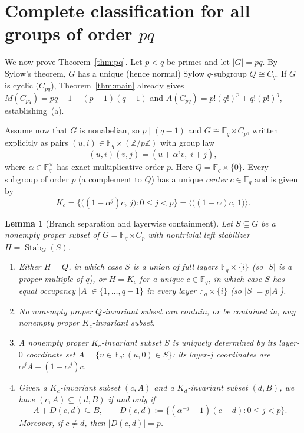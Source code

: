 \documentclass[11pt,reqno]{amsart}
\numberwithin{equation}{section}
\newtheorem{lemma}[theorem]{Lemma}
\theoremstyle{definition}
\theoremstyle{remark}
\newcommand{\Stab}{\operatorname{Stab}}
\newcommand{\F}{\mathbb{F}}
\newcommand{\Z}{\mathbb{Z}}
\begin{document}
\section{Complete classification for all groups of order $pq$}
\label{sec:pq}

We now prove Theorem~\ref{thm:pq}. Let $p<q$ be primes and let $|G|=pq$. By Sylow's theorem, $G$ has a unique (hence normal) Sylow $q$-subgroup $Q\cong C_q$. If $G$ is cyclic ($C_{pq}$), Theorem~\ref{thm:main} already gives $M(C_{pq})=pq-1+(p-1)(q-1)$ and $A(C_{pq})=p!(q!)^p+q!(p!)^q$, establishing~(a).

Assume now that $G$ is nonabelian, so $p\mid (q-1)$ and $G \cong \F_q \rtimes C_p$, written explicitly as pairs $(u,i)\in \F_q\times (\Z/p\Z)$ with group law
\[
(u,i)(v,j) = (u + \alpha^i v,\; i+j),
\]
where $\alpha\in\F_q^\times$ has exact multiplicative order $p$. Here $Q=\F_q\times\{0\}$. Every subgroup of order $p$ (a complement to $Q$) has a unique \emph{center} $c\in\F_q$ and is given by
\[
K_c = \bigl\{\bigl((1-\alpha^j)c,\, j\bigr) : 0\le j<p\bigr\} = \bigl\langle\bigl((1-\alpha)c,\, 1\bigr)\bigr\rangle.
\]

\begin{lemma}[Branch separation and layerwise containment]
\label{lem:pq-branches}
Let $S\subsetneq G$ be a nonempty proper subset of $G=\F_q\rtimes C_p$ with nontrivial left stabilizer $H=\Stab_G(S)$.
\begin{enumerate}[label=(\arabic*),leftmargin=2em]
\item Either $H=Q$, in which case $S$ is a union of full layers $\F_q\times\{i\}$ (so $|S|$ is a proper multiple of $q$), or $H=K_c$ for a unique $c\in\F_q$, in which case $S$ has equal occupancy $|A|\in\{1,\ldots,q-1\}$ in every layer $\F_q\times\{i\}$ (so $|S|=p|A|$).
\item No nonempty proper $Q$-invariant subset can contain, or be contained in, any nonempty proper $K_c$-invariant subset.
\item A nonempty proper $K_c$-invariant subset $S$ is uniquely determined by its layer-$0$ coordinate set $A=\{u\in\F_q : (u,0)\in S\}$: its layer-$j$ coordinates are $\alpha^j A + (1-\alpha^j)c$.
\item Given a $K_c$-invariant subset $(c,A)$ and a $K_d$-invariant subset $(d,B)$, we have $(c,A)\subseteq (d,B)$ if and only if
\begin{equation}
\label{eq:layer-contain}
A + D(c,d) \subseteq B,\qquad D(c,d) := \bigl\{(\alpha^{-j}-1)(c-d) : 0\le j<p\bigr\}.
\end{equation}
Moreover, if $c\neq d$, then $|D(c,d)|=p$.
\end{enumerate}
\end{lemma}
\end{document}
